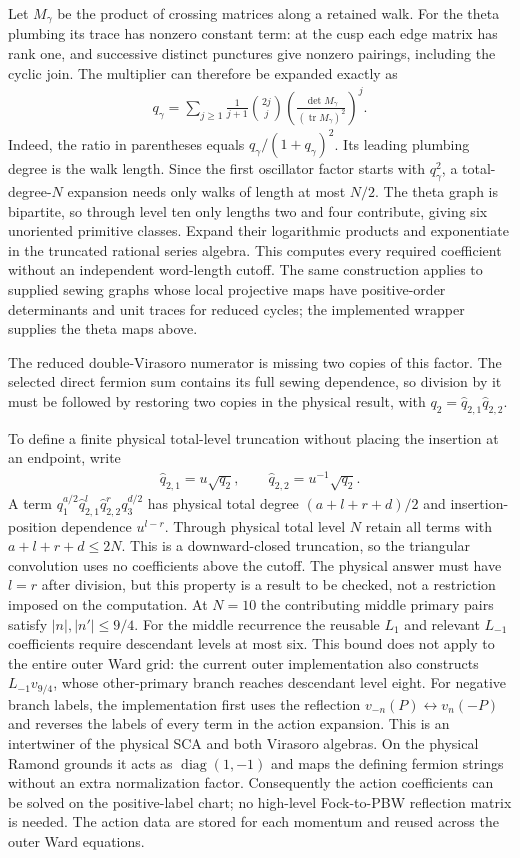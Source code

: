 \documentclass[12pt]{article}
\newcommand{\ie}{\begin{equation}\begin{aligned}}
\newcommand{\fe}{\end{aligned}\end{equation}}
\numberwithin{equation}{section}
\begin{document}
Let $M_\gamma$ be the product of crossing matrices along a retained walk.
For the theta plumbing its trace has nonzero constant term: at the cusp
each edge matrix has rank one, and successive distinct punctures give
nonzero pairings, including the cyclic join.  The multiplier can therefore
be expanded exactly as
\ie
 q_\gamma=\sum_{j\geq1}\frac{1}{j+1}\binom{2j}{j}
 \left(\frac{\det M_\gamma}{(\operatorname{tr}M_\gamma)^2}\right)^j.
\fe
Indeed, the ratio in parentheses equals $q_\gamma/(1+q_\gamma)^2$.
Its leading plumbing degree is the walk length.  Since the first
oscillator factor starts with $q_\gamma^2$, a total-degree-$N$ expansion
needs only walks of length at most $N/2$.  The theta graph is bipartite,
so through level ten only lengths two and four contribute, giving six
unoriented primitive classes.  Expand their logarithmic products and
exponentiate in the truncated rational series algebra.  This computes
every required coefficient without an independent word-length cutoff.
The same construction applies to supplied sewing graphs whose local
projective maps have positive-order determinants and unit traces for
reduced cycles; the implemented wrapper supplies the theta maps above.

The reduced double-Virasoro numerator is missing two copies of this
factor.  The selected direct fermion sum contains its full sewing
dependence, so division by it must be followed by restoring two copies
in the physical result, with $q_2=\hat q_{2,1}\hat q_{2,2}$.

To define a finite physical total-level truncation without placing the
insertion at an endpoint, write
\ie
 \hat q_{2,1}=u\sqrt{q_2},\qquad
 \hat q_{2,2}=u^{-1}\sqrt{q_2}.
\fe
A term $q_1^{a/2}\hat q_{2,1}^l\hat q_{2,2}^r q_3^{d/2}$ has
physical total degree $(a+l+r+d)/2$ and insertion-position dependence
$u^{l-r}$.  Through physical total level $N$ retain all terms with
$a+l+r+d\leq2N$.  This is a downward-closed truncation, so the
triangular convolution uses no coefficients above the cutoff.
The physical answer must have $l=r$ after division, but this property
is a result to be checked, not a restriction imposed on the computation.
At $N=10$ the contributing middle primary pairs satisfy
$|n|,|n'|\leq9/4$.  For the middle recurrence the reusable $L_1$ and
relevant $L_{-1}$ coefficients require descendant levels at most six.
This bound does not apply to the entire outer Ward grid: the current
outer implementation also constructs $L_{-1}v_{9/4}$, whose other-primary
branch reaches descendant level eight.
For negative branch labels, the implementation first uses the
reflection $v_{-n}(P)\leftrightarrow v_n(-P)$ and reverses the labels
of every term in the action expansion.  This is an intertwiner of
the physical SCA and both Virasoro algebras.  On the physical Ramond
grounds it acts as $\operatorname{diag}(1,-1)$ and maps the defining
fermion strings without an extra normalization factor.  Consequently
the action coefficients can be solved on the positive-label chart;
no high-level Fock-to-PBW reflection matrix is needed.  The action
data are stored for each momentum and reused across the outer Ward
equations.
\end{document}
